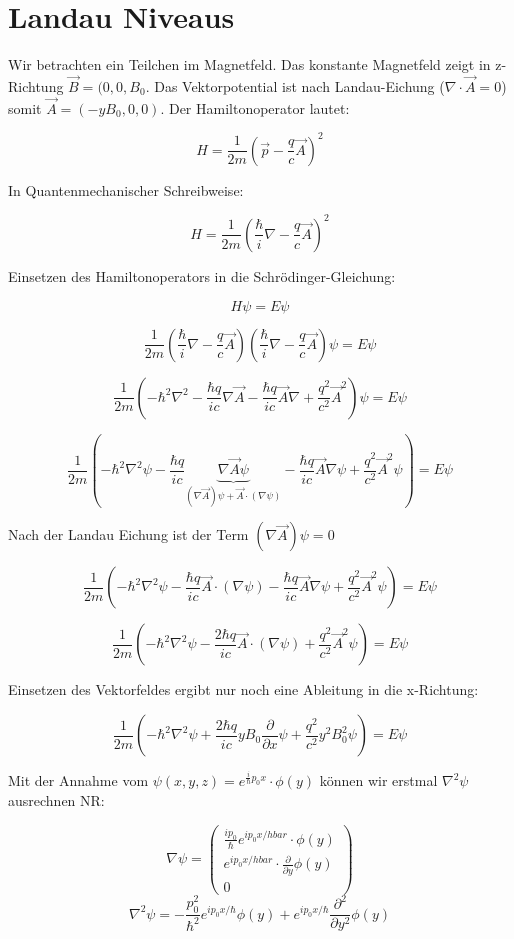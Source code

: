 



\section*{Landau Niveaus}

Wir betrachten ein Teilchen im Magnetfeld. Das konstante Magnetfeld zeigt in z-Richtung \(\vec B=(0,0,B_0\). Das Vektorpotential ist nach Landau-Eichung (\(\nabla\cdot\vec A = 0\)) somit \(\vec A = (-yB_0,0,0)\). Der Hamiltonoperator lautet:

\[H=\frac{1}{2m}\left(\vec p - \frac{q}{c}\vec A\right)^2 \]


In Quantenmechanischer Schreibweise:

\[H=\frac{1}{2m}\left(\frac{\hbar}{i}\nabla - \frac{q}{c}\vec A\right)^2 \]

Einsetzen des Hamiltonoperators in die Schrödinger-Gleichung:

\[H\psi = E\psi\]

\[ \frac{1}{2m}\left(\frac{\hbar}{i}\nabla - \frac{q}{c}\vec A\right)\left(\frac{\hbar}{i}\nabla - \frac{q}{c}\vec A\right)\psi = E\psi \]

\[ \frac{1}{2m}\left(-\hbar^2\nabla^2 -\frac{\hbar q}{ic}\nabla \vec A -\frac{\hbar q}{ic} \vec A \nabla  + \frac{q^2}{c^2}\vec A^2 \right) \psi = E\psi \]


\[ \frac{1}{2m}\left(-\hbar^2\nabla^2\psi -\frac{\hbar q}{ic}\underbrace{\nabla \vec A\psi}_{(\nabla \vec A)\psi + \vec A\cdot(\nabla\psi)} -\frac{\hbar q}{ic} \vec A \nabla\psi  + \frac{q^2}{c^2}\vec A^2\psi \right) = E\psi \]

Nach der Landau Eichung ist der Term \((\nabla \vec A)\psi = 0\)

\[ \frac{1}{2m}\left(-\hbar^2\nabla^2\psi -\frac{\hbar q}{ic}\vec A\cdot(\nabla\psi) -\frac{\hbar q}{ic} \vec A \nabla\psi  + \frac{q^2}{c^2}\vec A^2\psi \right) = E\psi \]

\[ \frac{1}{2m}\left(-\hbar^2\nabla^2\psi - \frac{2 \hbar q}{ic}\vec A\cdot(\nabla\psi) + \frac{q^2}{c^2}\vec A^2\psi \right) = E\psi \]


Einsetzen des Vektorfeldes ergibt nur noch eine Ableitung in die x-Richtung:


\[ \frac{1}{2m}\left(-\hbar^2\nabla^2\psi + \frac{2 \hbar q}{ic} yB_0 \frac{\partial}{\partial x} \psi + \frac{q^2}{c^2}y^2B_0^2\psi \right) = E\psi \]

Mit der Annahme vom \(\psi(x,y,z) = e^{\frac{i}{\hbar}p_0x}\cdot \phi(y)\) können wir erstmal \(\nabla^2\psi\) ausrechnen NR:

\[\nabla\psi = \begin{pmatrix} \frac{ip_0}{\hbar}e^{ip_0x/hbar}\cdot\phi(y)\\ e^{ip_0x/hbar}\cdot\frac{\partial}{\partial y}\phi(y)\\0\end{pmatrix}  \]
\[\nabla^2\psi =- \frac{p_0^2}{\hbar^2}e^{ip_0x/\hbar}\phi(y) + e^{ip_0x/\hbar}\frac{\partial^2}{\partial y^2}\phi(y)  \]








